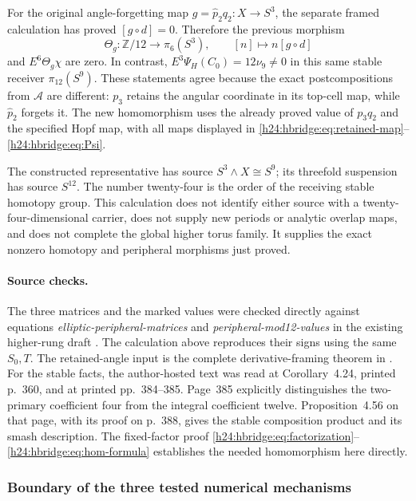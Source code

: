 For the original angle-forgetting map
\(g=\widehat p_2q_2:X\to S^3\), the separate framed
calculation has proved \([g\circ d]=0\). Therefore the
previous morphism
\[
\Theta_g:\mathbb Z/12\longrightarrow\pi_6(S^3),
\qquad [n]\longmapsto n[g\circ d]
\]
and \(E^6\Theta_g\chi\) are zero. In contrast,
\(E^3\Psi_H(C_0)=12\nu_9\ne0\) in this same stable
receiver \(\pi_{12}(S^9)\). These statements agree because
the exact postcompositions from \(\mathcal A\) are different:
\(p_3\) retains the angular coordinate in its top-cell map,
while \(\widehat p_2\) forgets it. The new homomorphism
uses the already proved value of \(p_3q_2\) and the specified
Hopf map, with all maps displayed in
\eqref{h24:hbridge:eq:retained-map}--\eqref{h24:hbridge:eq:Psi}.

The constructed representative has source \(S^3\wedge X\cong
S^9\); its threefold suspension has source \(S^{12}\).
The number twenty-four is the order of the receiving stable
homotopy group. This calculation does not identify either source
with a twenty-four-dimensional carrier, does not supply new
periods or analytic overlap maps, and does not complete the
global higher torus family. It supplies the exact nonzero
homotopy and peripheral morphisms just proved.

\paragraph{Source checks.}
The three matrices and the marked values were checked directly
against equations \emph{elliptic-peripheral-matrices} and
\emph{peripheral-mod12-values} in the existing higher-rung draft
\cite{h24:hbridgebib:HBHigher}. The calculation above reproduces their signs
using the same \(S_0,T\). The retained-angle input is the
complete derivative-framing theorem in \cite{h24:hbridgebib:HBRetained}.
For the stable facts, the author-hosted text
\cite{h24:hbridgebib:HBHatcher} was read at Corollary~4.24, printed p.~360,
and at printed pp.~384--385. Page~385 explicitly distinguishes
the two-primary coefficient four from the integral coefficient
twelve. Proposition~4.56 on that page, with its proof on
p.~388, gives the stable composition product and its smash
description. The fixed-factor proof
\eqref{h24:hbridge:eq:factorization}--\eqref{h24:hbridge:eq:hom-formula}
establishes the needed homomorphism here directly.

\subsubsection{Boundary of the three tested numerical mechanisms}


